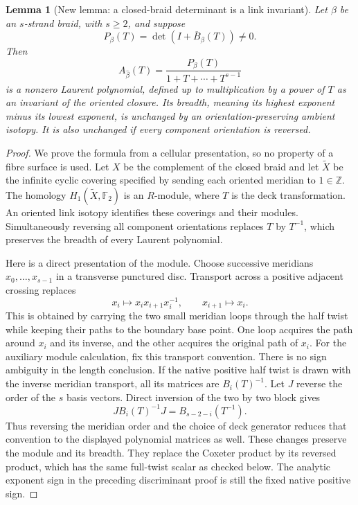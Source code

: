 \documentclass[11pt,oneside]{report}
\newtheorem{lemma}[theorem]{Lemma}
\theoremstyle{definition}
\numberwithin{equation}{section}
\begin{document}
\begin{lemma}[New lemma: a closed-braid determinant is a link invariant]
\label{J15:lem:alexander-determinant}
Let $\beta$ be an $s$-strand braid, with $s\geq2$, and suppose
\[
 P_\beta(T)=\det(I+\overline B_\beta(T))\ne0.
\]
Then
\begin{equation}\label{J15:eq:alexander-quotient}
 A_{\widehat\beta}(T)
   =\frac{P_\beta(T)}{1+T+\cdots+T^{s-1}}
\end{equation}
is a nonzero Laurent polynomial, defined up to multiplication by a
power of $T$ as an invariant of the oriented closure.
Its breadth, meaning its highest exponent minus its lowest exponent,
is unchanged by an orientation-preserving ambient isotopy.
It is also unchanged if every component orientation is reversed.
\end{lemma}
\begin{proof}
We prove the formula from a cellular presentation, so no property of
a fibre surface is used. Let $X$ be the complement of the closed
braid and let $\widetilde X$ be the infinite cyclic covering
specified by sending each oriented meridian to $1\in\mathbb Z$.
The homology $H_1(\widetilde X,\mathbb F_2)$ is an $R$-module,
where $T$ is the deck transformation. An oriented link isotopy
identifies these coverings and their modules. Simultaneously reversing
all component orientations replaces $T$ by $T^{-1}$, which preserves
the breadth of every Laurent polynomial.

Here is a direct presentation of the module. Choose successive
meridians $x_0,\ldots,x_{s-1}$ in a transverse punctured disc.
Transport across a positive adjacent crossing replaces
\[
 x_i\longmapsto x_ix_{i+1}x_i^{-1},\qquad
 x_{i+1}\longmapsto x_i.
\]
This is obtained by carrying the two small meridian loops through
the half twist while keeping their paths to the boundary base point.
One loop acquires the path around $x_i$ and its inverse, and the
other acquires the original path of $x_i$.
For the auxiliary module calculation, fix this transport convention.
There is no sign ambiguity in the length conclusion. If the native
positive half twist is drawn with the inverse meridian transport,
all its matrices are $B_i(T)^{-1}$. Let $J$ reverse the order of the
$s$ basis vectors. Direct inversion of the two by two block gives
\[
 J B_i(T)^{-1}J=B_{s-2-i}(T^{-1}).
\]
Thus reversing the meridian order and the choice of deck generator
reduces that convention to the displayed polynomial matrices as well.
These changes preserve the module and its breadth. They replace the
Coxeter product by its reversed product, which has the same full-twist
scalar as checked below. The analytic exponent sign in the preceding
discriminant proof is still the fixed native positive sign.


\end{proof}
\end{document}
